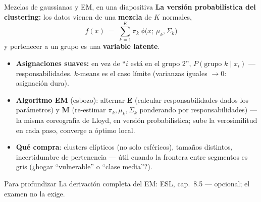 \documentclass{beamer}
\newcommand{\1}{\mathbb{I}}
\begin{document}
\begin{frame}{Mezclas de gaussianas y EM, en una diapositiva}
\small
\textbf{La versión probabilística del clustering:} los datos vienen de una \textbf{mezcla} de $K$ normales,
\[ f(x) \;=\; \sum_{k=1}^{K} \pi_k \, \phi\big(x;\, \mu_k, \Sigma_k\big) \]
y pertenecer a un grupo es una \textbf{variable latente}.
\pause

\begin{itemize}\itemsep5pt
  \item \textbf{Asignaciones suaves:} en vez de ``$i$ está en el grupo 2'', $P(\text{grupo } k \mid x_i)$ --- responsabilidades. $k$-means es el caso límite (varianzas iguales $\to 0$: asignación dura). \pause
  \item \textbf{Algoritmo EM} (esbozo): alternar \textbf{E} (calcular responsabilidades dados los parámetros) y \textbf{M} (re-estimar $\pi_k, \mu_k, \Sigma_k$ ponderando por responsabilidades) --- la misma coreografía de Lloyd, en versión probabilística; sube la verosimilitud en cada paso, converge a óptimo local. \pause
  \item \textbf{Qué compra}: clusters elípticos (no solo esféricos), tamaños distintos, incertidumbre de pertenencia --- útil cuando la frontera entre segmentos es gris (¿hogar ``vulnerable'' o ``clase media''?).
\end{itemize}
\pause

\begin{block}{Para profundizar}
La derivación completa del EM: ESL, cap.\ 8.5 --- opcional; el examen no la exige.
\end{block}
\end{frame}
\end{document}
